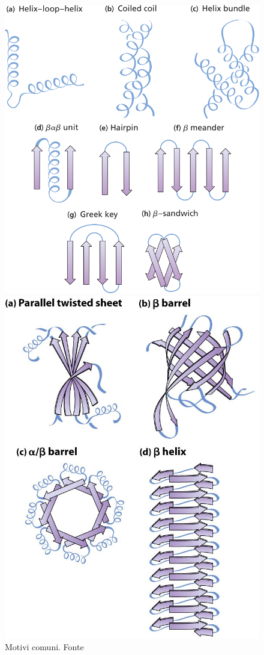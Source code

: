 {{\begin{figure}[!htb]
	\centering
	\includegraphics[scale=0.4]{images/motivi-comuni.png}
	\caption{Motivi comuni. Fonte \cite{moran2012principles}}
	\label{fig:motivi-comuni}
	\endminipage\hfill
	\centering
	\includegraphics[scale=0.5]{images/domain-folds.jpg}

\end{figure}}}
